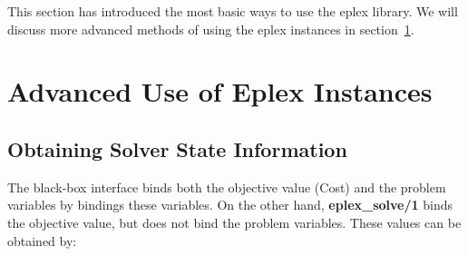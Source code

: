 This section has introduced the most basic ways to use the eplex library. 
We will discuss more advanced methods of using the eplex instances in
section~\ref{eplex-instance-advanced}. 


\section{Advanced Use of Eplex Instances}
\label{eplex-instance-advanced}

\subsection{Obtaining Solver State Information}
\label{eplex-instance-solver-info}
The black-box interface binds both the objective value (Cost) and the
problem variables by bindings these variables. On the other hand, {\bf
  eplex_solve/1} binds the objective value, but does not bind the problem
variables. These values can be obtained by:

